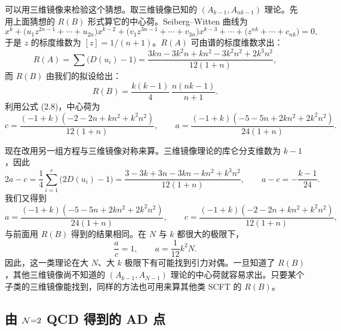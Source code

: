 可以用三维镜像来检验这个猜想。取三维镜像已知的 $(A_{k-1},A_{nk-1})$ 理论。先用上面猜想的 $R(B)$ 形式算它的中心荷。Seiberg--Witten 曲线为
\begin{equation}
x^k+\bigl(u_1z^{2n-1}+\cdots+u_{2n}\bigr)x^{k-2}
+\bigl(v_1z^{3n-1}+\cdots+v_{3n}\bigr)x^{k-3}
+\cdots+\bigl(z^{nk}+\cdots+c_{nk}\bigr) = 0 ,
\label{eq:6.36}\tag{6.36}
\end{equation}
于是 $z$ 的标度维数为 $[z]=1/(n+1)$。$R(A)$ 可由谱的标度维数求出：
\begin{equation}
R(A) = \sum\bigl(D(u_i)-1\bigr)
= \frac{3kn-3k^2n+kn^2-3k^2n^2+2k^3n^2}{12(1+n)} ,
\label{eq:6.37}\tag{6.37}
\end{equation}
而 $R(B)$ 由我们的拟设给出：
\begin{equation}
R(B) = \frac{k(k-1)}{4}\,\frac{n(nk-1)}{n+1} .
\label{eq:6.38}\tag{6.38}
\end{equation}
利用公式 (2.8)，中心荷为
\begin{equation}
c = \frac{(-1+k)(-2-2n+kn^2+k^2n^2)}{12(1+n)},\qquad
a = \frac{(-1+k)(-5-5n+2kn^2+2k^2n^2)}{24(1+n)} .
\label{eq:6.39}\tag{6.39}
\end{equation}

现在改用另一组方程与三维镜像对称来算。三维镜像理论的库仑分支维数为 $k-1$，因此
\begin{equation}
2a-c = \frac{1}{4}\sum_{i=1}^{r}\bigl(2D(u_i)-1\bigr)
= \frac{3-3k+3n-3kn-kn^2+k^3n^2}{12(1+n)},\qquad
a-c = -\frac{k-1}{24} .
\label{eq:6.40}\tag{6.40}
\end{equation}
我们又得到
\begin{equation}
a = \frac{(-1+k)(-5-5n+2kn^2+2k^2n^2)}{24(1+n)},\qquad
c = \frac{(-1+k)(-2-2n+kn^2+k^2n^2)}{12(1+n)} ,
\label{eq:6.41}\tag{6.41}
\end{equation}
与前面用 $R(B)$ 得到的结果相同。在 $N$ 与 $k$ 都很大的极限下，
\begin{equation}
\frac{a}{c} = 1,\qquad a = \frac{1}{12}k^2N .
\label{eq:6.42}\tag{6.42}
\end{equation}
因此，这一类理论在大 $N$、大 $k$ 极限下有可能找到引力对偶。一旦知道了 $R(B)$，其他三维镜像尚不知道的 $(A_{k-1},A_{N-1})$ 理论的中心荷就容易求出。只要某个子类的三维镜像能找到，同样的方法也可用来算其他类 SCFT 的 $R(B)$。

\subsection{由 $\mathcal{N}{=}2$ QCD 得到的 AD 点}
\label{sec:6.5}


